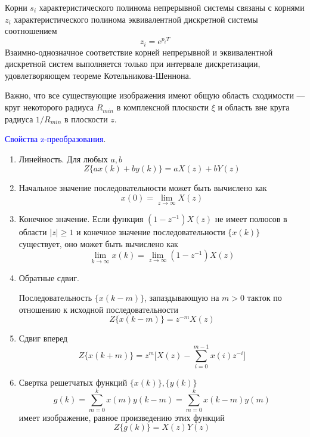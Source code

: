 Корни $s_i$ характеристического полинома непрерывной системы связаны с корнями $z_i$ характеристического полинома эквивалентной дискретной системы соотношением
\begin{equation}
    z_i = e^{p_iT}
\end{equation}
Взаимно-однозначное соответствие корней непрерывной и эквивалентной дискретной систем выполняется только при интервале дискретизации, удовлетворяющем теореме Котельникова-Шеннона.

Важно, что все существующие изображения имеют общую область сходимости --- круг некоторого радиуса $R_{min}$ в комплексной плоскости $\xi$ и область вне круга радиуса $1/ R_{min}$ в плоскости $z$.

\textcolor{blue}{Свойства z-преобразования}.

\begin{enumerate}
    \item Линейность. Для любых $a, b$
    \begin{equation}
        Z\{a x(k) + b y(k)\} = a X(z) + b Y(z)
    \end{equation}
    
    \item Начальное значение последовательности может быть вычислено как
    \begin{equation}
        x(0) = \lim\limits_{z \rightarrow \infty} X(z)
    \end{equation}
    
    \item Конечное значение. Если функция $(1-z^{-1}) X(z)$ не имеет полюсов в области $|z| \ge 1$ и конечное значение последовательности $\{x(k)\}$ существует, оно может быть вычислено как
    \begin{equation}
        \lim\limits_{k \rightarrow \infty} x(k) = \lim\limits_{z \rightarrow \infty} (1-z^{-1}) X(z)
    \end{equation}
    
    \item Обратные сдвиг.
    
    Последовательность $\{x(k-m)\}$, запаздывающую на $m > 0$ такток по отношению к исходной последовательности
    \begin{equation}
        Z\{x(k-m)\} = z^{-m} X(z)
    \end{equation}
    
    \item Сдвиг вперед
    \begin{equation}
        Z\{x(k+m)\} = z^{m} \Bigg[ X(z) - \sum\limits_{i=0}^{m-1} x(i) z^{-i} \Bigg]        
    \end{equation}
    
    \item Свертка решетчатых функций $\{x(k)\}, \{y(k)\}$
    \begin{equation}
        g(k) = \sum\limits_{m=0}^{k} x(m) y(k-m) = \sum\limits_{m=0}^{k} x(k-m) y(m)
    \end{equation}
    имеет изображение, равное произведению этих функций
    \begin{equation}
        Z\{g(k)\} = X(z) Y(z)
    \end{equation}
\end{enumerate}